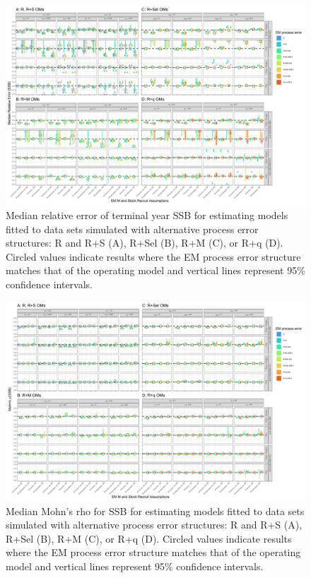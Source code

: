 \documentclass[
  12pt,
]{article}
\begin{document}
\begin{landscape}
\begin{figure}
\begin{center}
\includegraphics{term_SSB_bias_plots}
\end{center}
\caption{Median relative error of terminal year SSB for estimating models fitted to data sets simulated with alternative process error structures: R and R+S (A), R+Sel (B), R+M (C), or R+q (D). Circled values indicate results where the EM process error structure matches that of the operating model and vertical lines represent 95\% confidence intervals.}\label{SSB_rel_error}
\end{figure}
\end{landscape}

\begin{landscape}
\begin{figure}
\begin{center}
\includegraphics{mohns_rho_ssb_plots}
\end{center}
\caption{Median Mohn's rho for SSB for estimating models fitted to data sets simulated with alternative process error structures: R and R+S (A), R+Sel (B), R+M (C), or R+q (D). Circled values indicate results where the EM process error structure matches that of the operating model and vertical lines represent 95\% confidence intervals.}\label{mohns_rho_ssb}
\end{figure}
\end{landscape}
\end{document}
